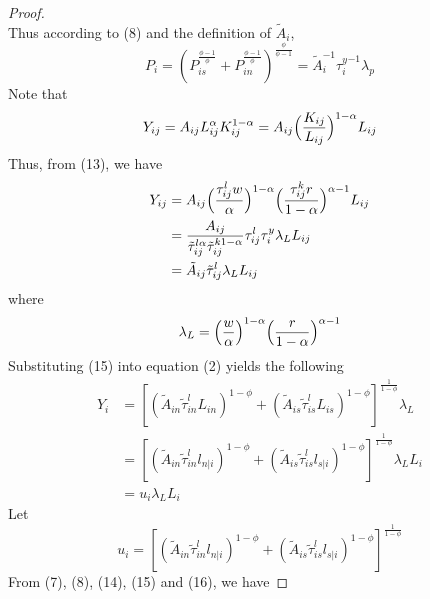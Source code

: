 \documentclass{article}
\begin{document}
\begin{proof}
\begin{equation}
    \end{equation}
    Thus according to (8) and the definition of $\tilde{A}_i$,
    \begin{equation*}
        P_i=(P_{is}^{\frac{\phi-1}{\phi}}+P_{in}^{\frac{\phi-1}{\phi}})^{\frac{\phi}{\phi-1}}=\tilde{A}_{i}^{-1} {\tau_i^{y}}^{-1} \lambda_p
    \end{equation*}
    Note that
    \begin{equation*}
        Y_{ij}=A_{ij}L_{ij}^{\alpha}K_{ij}^{1-\alpha}=A_{ij} \Bigl( \frac{K_{ij}}{L_{ij}} \Bigr)^{1-\alpha} L_{ij}
    \end{equation*}
    Thus, from (13), we have
    \begin{equation}
        \begin{aligned}
        Y_{ij}&=A_{ij}\Bigl( \frac{\tau_{ij}^l w}{\alpha} \Bigr)^{1-\alpha} \Bigl( \frac{\tau_{ij}^k r}{1-\alpha} \Bigr)^{\alpha-1} L_{ij}\\
        &= \frac{A_{ij}}{\tilde{\tau}_{ij}^{l\alpha} \tilde{\tau}_{ij}^{k 1-\alpha}} \tau_{ij}^l \tau_i^y \lambda_L L_{ij}\\
        &=\tilde{A}_{ij} \tilde{\tau}_{ij}^l \lambda_L L_{ij}
        \end{aligned}
    \end{equation}
    where
    \begin{equation*}
        \lambda_L=\Bigl( \frac{w}{\alpha} \Bigr)^{1-\alpha} \Bigl( \frac{r}{1-\alpha} \Bigr)^{\alpha-1}
    \end{equation*}
    Substituting (15) into equation (2) yields the following
    \begin{equation}
        \begin{aligned}
            Y_i&=[(\tilde{A}_{in} \tilde{\tau}_{in}^l L_{in})^{1-\phi} + (\tilde{A}_{is} \tilde{\tau}_{is}^l L_{is})^{1-\phi}]^{\frac{1}{1-\phi}} \lambda_L\\
            &=[(\tilde{A}_{in} \tilde{\tau}_{in}^l l_{n|i})^{1-\phi} + (\tilde{A}_{is} \tilde{\tau}_{is}^l l_{s|i})^{1-\phi}]^{\frac{1}{1-\phi}} \lambda_L L_i\\
            &=u_i \lambda_L L_i
        \end{aligned}
    \end{equation}
    Let 
    \begin{equation*}
        u_i=[(\tilde{A}_{in} \tilde{\tau}_{in}^l l_{n|i})^{1-\phi} + (\tilde{A}_{is} \tilde{\tau}_{is}^l l_{s|i})^{1-\phi}]^{\frac{1}{1-\phi}}
    \end{equation*}
    From (7), (8), (14), (15) and (16), we have

\end{proof}
\end{document}
